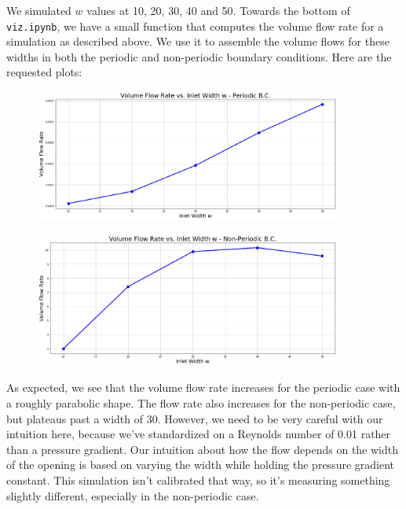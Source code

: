 \documentclass[11pt]{article}
\newcommand{\tty}[1]{\texttt{#1}}
\begin{document}
We simulated $w$ values at 10, 20, 30, 40 and 50.
Towards the bottom of \tty{viz.ipynb}, we have a small function that computes
the volume flow rate for a simulation as described above.
We use it to assemble the volume flows for these widths in both the 
periodic and non-periodic boundary conditions.
Here are the requested plots:
\begin{center}

\begin{figure}
\includegraphics[width=0.90\textwidth]{lbm_pbc_flow_vs_w.png}
\end{figure}

\begin{figure}
\includegraphics[width=0.90\textwidth]{lbm_mbc_flow_vs_w.png}
\end{figure}
\end{center}

As expected, we see that the volume flow rate increases for the periodic case with a roughly parabolic shape.  
The flow rate also increases for the non-periodic case, but plateaus past a width of 30.
However, we need to be very careful with our intuition here, because we've standardized on a Reynolds number
 of 0.01 rather than a pressure gradient.  Our intuition about how the flow depends on the width of the 
opening is based on varying the width while holding the pressure gradient constant.
This simulation isn't calibrated that way, so it's measuring something slightly different,
especially in the non-periodic case.
\end{document}
